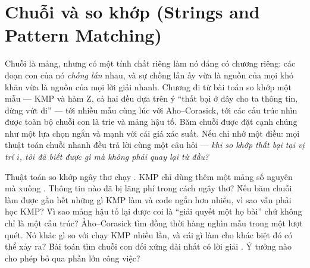\documentclass[../../algorithm.tex]{subfiles}
\begin{document}
\chapter{Chuỗi và so khớp (Strings and Pattern Matching)}

\begin{tomtat}
Chuỗi là mảng, nhưng có một tính chất riêng làm nó đáng có chương riêng: các đoạn con của nó \emph{chồng lấn} nhau, và sự chồng lấn ấy vừa là nguồn của mọi khó khăn vừa là nguồn của mọi lời giải nhanh. Chương đi từ bài toán so khớp một mẫu --- KMP và hàm Z, cả hai đều dựa trên ý ``thất bại ở đây cho ta thông tin, đừng vứt đi'' --- tới nhiều mẫu cùng lúc với Aho--Corasick, tới các cấu trúc nhìn được toàn bộ chuỗi con là trie và mảng hậu tố. Băm chuỗi được đặt cạnh chúng như một lựa chọn ngắn và mạnh với cái giá xác suất. Nếu chỉ nhớ một điều: mọi thuật toán chuỗi nhanh đều trả lời cùng một câu hỏi --- \emph{khi so khớp thất bại tại vị trí \(i\), tôi đã biết được gì mà không phải quay lại từ đầu?}
\end{tomtat}

\begin{nentang}
\end{nentang}

\begin{khoigoi}
\h{Thuật toán so khớp ngây thơ chạy . KMP chỉ dùng thêm một mảng số nguyên mà xuống . Thông tin nào đã bị lãng phí trong cách ngây thơ?}
\h{Nếu băm chuỗi làm được gần hết những gì KMP làm và code ngắn hơn nhiều, vì sao vẫn phải học KMP?}
\h{Vì sao mảng hậu tố lại được coi là ``giải quyết một họ bài'' chứ không chỉ là một cấu trúc?}
\h{Aho--Corasick tìm đồng thời hàng nghìn mẫu trong một lượt quét. Nó khác gì so với chạy KMP nhiều lần, và cái gì làm cho khác biệt đó có thể xảy ra?}
\h{Bài toán tìm chuỗi con đối xứng dài nhất có lời giải . Ý tưởng nào cho phép bỏ qua phần lớn công việc?}
\end{khoigoi}
\end{document}
